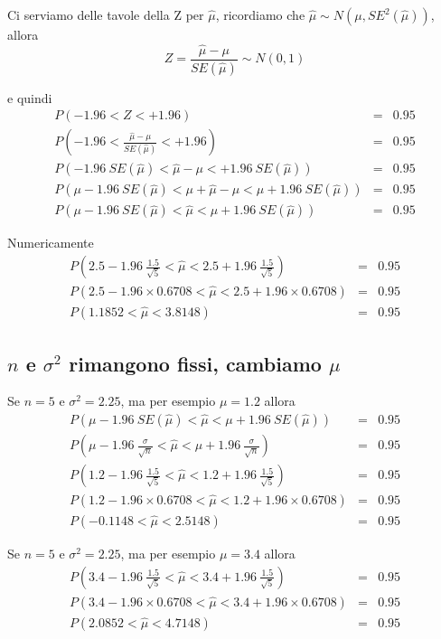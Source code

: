 \documentclass[
  11pt,
]{book}
\theoremstyle{mytheoremstyle}
\theoremstyle{mydefstyle}
\begin{document}
Ci serviamo delle tavole della Z per \(\hat \mu\), ricordiamo che \(\hat \mu\sim N(\mu,SE^2(\hat \mu))\), allora
\[Z=\frac{\hat \mu-\mu}{SE(\hat \mu)}\sim N(0,1)\]

e quindi
\begin{eqnarray*}
  P(-1.96<Z<+1.96) &=& 0.95 \\
  P\left(-1.96<\frac{\hat \mu -\mu}{SE(\hat \mu)}< +1.96\right) &=& 0.95 \\
  P\left(-1.96~SE(\hat \mu)<\hat \mu -\mu< +1.96~SE(\hat \mu)\right) &=& 0.95 \\  
  P\left(\mu-1.96~SE(\hat \mu)<\mu+\hat \mu -\mu< \mu+1.96~SE(\hat \mu)\right) &=& 0.95 \\    
  P(\mu-1.96~SE(\hat \mu)<\hat \mu<\mu+1.96~SE(\hat \mu)) &=& 0.95
\end{eqnarray*}

Numericamente
\begin{eqnarray*}
  P\left(2.5-1.96~\frac{1.5}{\sqrt{5}}<\hat \mu < 2.5+1.96~\frac{1.5}{\sqrt{5}}\right) &=& 0.95 \\
  P\left(2.5-1.96\times0.6708<\hat \mu < 2.5+1.96\times0.6708\right) &=& 0.95 \\
  P(1.1852 < \hat \mu < 3.8148) &=& 0.95 
\end{eqnarray*}

\subsection{\texorpdfstring{\(n\) e \(\sigma^2\) rimangono fissi, cambiamo \(\mu\)}{n e \textbackslash sigma\^{}2 rimangono fissi, cambiamo \textbackslash mu}}\label{n-e-sigma2-rimangono-fissi-cambiamo-mu}

Se \(n=5\) e \(\sigma^2=2.25\), ma per esempio \(\mu= 1.2\) allora
\begin{eqnarray*}
  P(\mu-1.96~SE(\hat \mu)<\hat \mu<\mu+1.96~SE(\hat \mu)) &=& 0.95\\
  P\left(\mu-1.96~\frac{\sigma}{\sqrt n}<\hat \mu < \mu+1.96~\frac{\sigma}{\sqrt n}\right) &=& 0.95 \\
  P\left(1.2-1.96~\frac{1.5}{\sqrt{5}}<\hat \mu < 1.2+1.96~\frac{1.5}{\sqrt{5}}\right) &=& 0.95 \\
  P\left(1.2-1.96\times0.6708<\hat \mu < 1.2+1.96\times0.6708\right) &=& 0.95 \\
  P(-0.1148 < \hat \mu < 2.5148) &=& 0.95 
\end{eqnarray*}

Se \(n=5\) e \(\sigma^2=2.25\), ma per esempio \(\mu= 3.4\) allora
\begin{eqnarray*}
  P\left(3.4-1.96~\frac{1.5}{\sqrt{5}}<\hat \mu < 3.4+1.96~\frac{1.5}{\sqrt{5}}\right) &=& 0.95 \\
  P\left(3.4-1.96\times0.6708<\hat \mu < 3.4+1.96\times0.6708\right) &=& 0.95 \\
  P(2.0852 < \hat \mu < 4.7148) &=& 0.95 
\end{eqnarray*}
\end{document}
